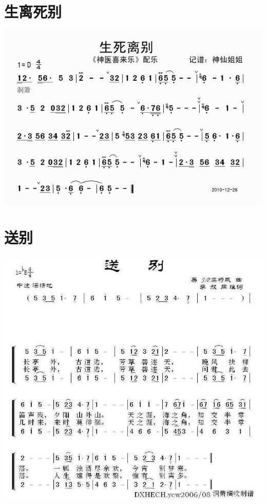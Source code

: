 \documentclass[cn,pad,chinese,chinesefont=nofont]{elegantbook}
\begin{document}
\section{生离死别}
    \includegraphics[width=\textwidth]{dongxiao/20200324生离死别.jpg}
\section{送别}
    \includegraphics[width=\textwidth]{dongxiao/20200324送别.jpg}  
\end{document}
